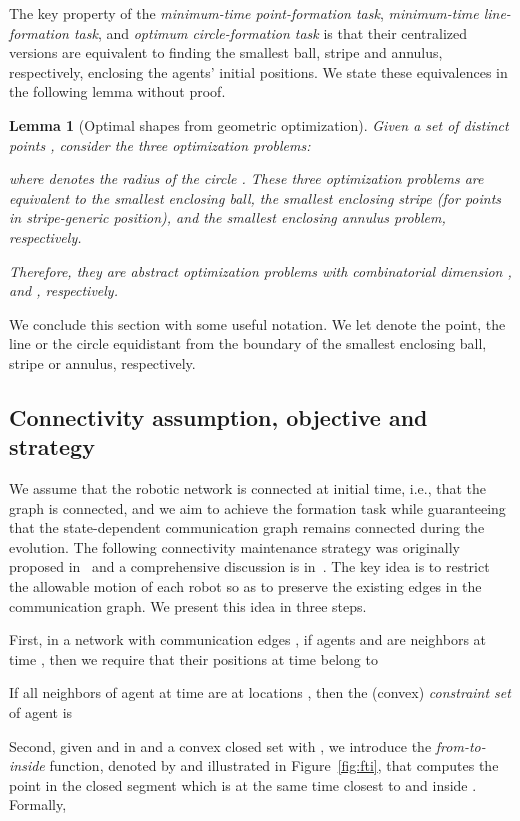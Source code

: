\documentclass[onecolumn,journal,letterpaper]{IEEEtran}
\newtheorem{lemma}[theorem]{Lemma}
{\theorembodyfont{\rmfamily} \newtheorem{conjecture}[theorem]{Conjecture}
\newtheorem{remark}[theorem]{Remark}
\newtheorem{remarks}[theorem]{Remarks}
\newtheorem{example}[theorem]{Example}
\newtheorem{algo}[theorem]{Algorithm}
\newtheorem{problem}[theorem]{Problem}}
\begin{document}
The key property of the \emph{minimum-time point-formation task},
\emph{minimum-time line-formation task}, and \emph{optimum circle-formation
  task} is that their centralized versions are equivalent to finding the
smallest ball, stripe and annulus, respectively, enclosing the  agents'
initial positions. We state these equivalences in the following lemma
without proof.

\begin{lemma}[Optimal shapes from geometric optimization]
  Given a set of distinct points ,
  consider the three optimization problems:
  
  where  denotes the radius of the circle .  These three
  optimization problems are equivalent to the smallest enclosing ball, the
  smallest enclosing stripe (for points in stripe-generic position), and
  the smallest enclosing annulus problem, respectively.

  Therefore, they are abstract optimization problems with combinatorial
  dimension ,  and , respectively.
\end{lemma}

We conclude this section with some useful notation.  We let
 denote the point, the line or the
circle equidistant from the boundary of the smallest enclosing ball, stripe
or annulus, respectively.


\subsection{Connectivity assumption, objective and strategy}
We assume that the robotic network is connected at initial time, i.e., that
the graph  is connected, and we aim to achieve
the formation task while guaranteeing that the state-dependent
communication graph remains connected during the evolution.  The following
connectivity maintenance strategy was originally proposed
in~\cite{HA-YO-IS-MY:99} and a comprehensive discussion is
in~\cite{FB-JC-SM:09}.  The key idea is to restrict the allowable motion of
each robot so as to preserve the existing edges in the communication graph.
We present this idea in three steps.

First, in a network with communication edges , if agents
 and  are neighbors at time , then we require that
their positions at time  belong to

If all neighbors of agent  at time  are at locations
, then the (convex) \emph{constraint
  set} of agent  is


Second, given  and  in  and a convex closed set  with , we introduce the \emph{from-to-inside} function,
denoted by  and illustrated in Figure~\ref{fig:fti}, that computes
the point in the closed segment  which is at the same time closest
to  and inside . Formally,
\end{document}
